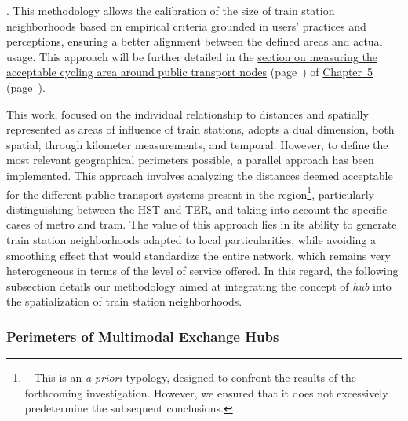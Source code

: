 \begin{refsegment}
{}. This methodology allows the calibration of the size of train station neighborhoods based on empirical criteria grounded in users' practices and perceptions, ensuring a better alignment between the defined areas and actual usage. This approach will be further detailed in the \hyperref[chap5:aire-cyclable-micromobilite]{section on measuring the acceptable cycling area around public transport nodes} (page~\pageref{chap5:aire-cyclable-micromobilite}) of \hyperref[chap5:titre]{Chapter~5} (page~\pageref{chap5:titre}).%

This work, focused on the individual relationship to distances and spatially represented as areas of influence of train stations, adopts a dual dimension, both spatial, through kilometer measurements, and temporal. However, to define the most relevant geographical perimeters possible, a parallel approach has been implemented. This approach involves analyzing the distances deemed acceptable for the different public transport systems present in the region\footnote{~
    This is an \textsl{a priori} typology, designed to confront the results of the forthcoming investigation. However, we ensured that it does not excessively predetermine the subsequent conclusions.
}, particularly distinguishing between the \acrshort{HST} and \acrshort{TER}, and taking into account the specific cases of metro and tram. The value of this approach lies in its ability to generate train station neighborhoods adapted to local particularities, while avoiding a smoothing effect that would standardize the entire network, which remains very heterogeneous in terms of the level of service offered. In this regard, the following subsection details our methodology aimed at integrating the concept of \textsl{hub} into the spatialization of train station neighborhoods.%

\subsubsection*{Perimeters of Multimodal Exchange Hubs
    \label{chap3:quartiers-gare-multimodaux}
    }


\end{refsegment}
